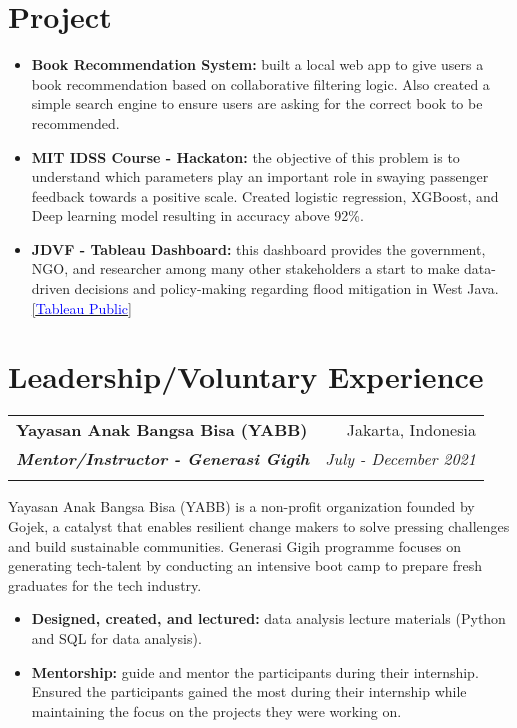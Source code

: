 \documentclass[a4paper, 11pt]{article}
\makeatletter
\newcommand{\resumeItem}[2]{
    \item\small{
        \textbf{#1}{#2 \vspace{-2pt}}
    }
}
\newcommand{\resumeSubheading}[4]{
    \vspace{-1pt}
    \begin{tabular*}{\textwidth}{l@{\extracolsep{\fill}}r}
        \color{lightblue}\textbf{#1} & #2 \\
        \textbf{\textit{\small#3}} & \textit{\small #4} \\
        \textnormal{}\vspace{-5pt}
    \end{tabular*}\vspace{-5pt}
}
\newcommand{\resumeItemListStart}{\begin{itemize}[leftmargin=*]\setlength\itemsep{0em}\vspace{-1pt}}
\newcommand{\resumeItemListEnd}{\end{itemize}\vspace{-5pt}}
\makeatother
\begin{document}
    \newpage
    \section{Project}

    \resumeItemListStart
    \resumeItem{Book Recommendation System:}{ built a local web app to give users a book
    recommendation based on collaborative filtering logic. Also created a simple search
    engine to ensure users are asking for the correct book to be recommended.
    \href{https://github.com/amrirasyidi/book_recommendation}\faGithub}
    \resumeItem{MIT IDSS Course - Hackaton:}{ the objective of this problem is to
    understand which parameters play an important role in swaying passenger feedback
    towards a positive scale. Created logistic regression, XGBoost, and Deep learning
    model resulting in accuracy above 92\%. 
    \href{https://github.com/amrirasyidi/mit_idss_hackaton}\faGithub}
    \resumeItem{JDVF - Tableau Dashboard:}{ this dashboard provides the government, NGO,
    and researcher among many other stakeholders a start to make data-driven decisions
    and policy-making regarding flood mitigation in West Java. 
    \href{https://public.tableau.com/app/profile/faisal.putra/viz/Book1_16671939458310/DashboardFINAL}{[\textcolor{blue}{Tableau Public}]}}
    \resumeItemListEnd
    
    \vspace{-10pt}
    \section{Leadership/Voluntary Experience}

    \resumeSubheading
    {Yayasan Anak Bangsa Bisa (YABB)}
    {Jakarta, Indonesia}
    {Mentor/Instructor - Generasi Gigih}
    {July - December 2021}
    \small{Yayasan Anak Bangsa Bisa (YABB) is a non-profit organization founded by Gojek, a
    catalyst that enables resilient change makers to solve pressing challenges and build
    sustainable communities. Generasi Gigih programme focuses on generating tech-talent
    by conducting an intensive boot camp to prepare fresh graduates for the tech industry.}
    \vspace{-1pt}
    \resumeItemListStart
    \resumeItem{Designed, created, and lectured:}{ data analysis lecture materials (Python and SQL
    for data analysis).}
    \resumeItem{Mentorship:}{ guide and mentor the participants during their internship. Ensured the participants gained the most during their internship while maintaining the focus on the projects they were working on.}
    \resumeItemListEnd
\end{document}
